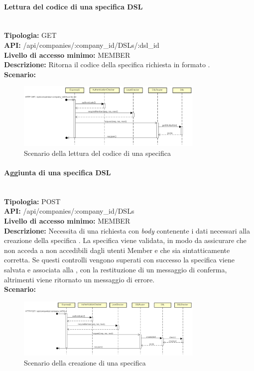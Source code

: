 \paragraph{Lettura del codice di una specifica DSL}\mbox{}\\
\textbf{Tipologia:} GET \\
\textbf{API:} /api/companies/:company\_id/DSLs/:dsl\_id \\
\textbf{Livello di accesso minimo:} MEMBER \\
\textbf{Descrizione:} Ritorna il codice della specifica  richiesta in formato . \\
\textbf{Scenario:} 
\begin{figure}[H]
\centering
\includegraphics[width=0.8\textwidth]{res/sections/backend/sequence/(GET)dslByID.png}
\caption{Scenario della lettura del codice di una specifica }
\end{figure}

\newpage
\paragraph{Aggiunta di una specifica DSL}\mbox{}\\
\textbf{Tipologia:} POST \\
\textbf{API:} /api/companies/:company\_id/DSLs \\
\textbf{Livello di accesso minimo:} MEMBER \\
\textbf{Descrizione:} Necessita di una richiesta con \textit{body} contenente i dati necessari alla creazione della specifica . La specifica  viene validata, in modo da assicurare che non acceda a  non accedibili dagli utenti Member e che sia sintatticamente corretta. Se questi controlli vengono superati con successo la specifica  viene salvata e associata alla , con la restituzione di un messaggio di conferma, altrimenti viene ritornato un messaggio di errore. \\
\textbf{Scenario:} 
\begin{figure}[H]
\centering
\includegraphics[width=0.8\textwidth]{res/sections/backend/sequence/(POST)dsl.png}
\caption{Scenario della creazione di una specifica }
\end{figure}

